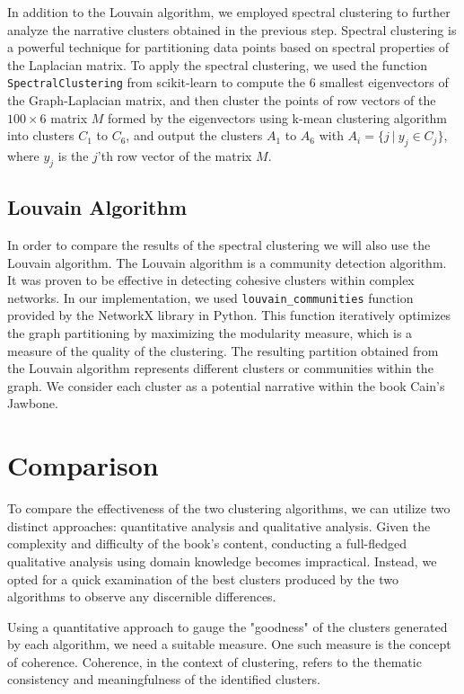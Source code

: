 \documentclass[a4paper]{article}
\begin{document}
In addition to the Louvain algorithm, we employed spectral clustering to further analyze the narrative clusters obtained in the previous step. Spectral clustering is a powerful technique for partitioning data points based on spectral properties of the Laplacian matrix. To apply the spectral clustering, we used the function \verb|SpectralClustering| from scikit-learn \cite{sklearn} to compute the 6 smallest eigenvectors of the Graph-Laplacian matrix, and then cluster the points of row vectors of the $100 \times 6$ matrix $M$ formed by the eigenvectors using k-mean clustering algorithm into clusters $C_1$ to $C_6$, and output the clusters $A_1$ to $A_6$ with $A_{i} = \{j \ | \ y_{j} \in C_{j}\}$, where $y_{j}$ is the $j$'th row vector of the matrix $M$.

\subsection{Louvain Algorithm}

In order to compare the results of the spectral clustering we will also use the Louvain algorithm. The Louvain algorithm is a community detection algorithm. It was proven to be effective in detecting cohesive clusters within complex networks. In our implementation, we used \verb|louvain_communities| function provided by the NetworkX \cite{networkx} library in Python. This function iteratively optimizes the graph partitioning by maximizing the modularity measure, which is a measure of the quality of the clustering. The resulting partition obtained from the Louvain algorithm represents different clusters or communities within the graph. We consider each cluster as a potential narrative within the book Cain's Jawbone.


\section{Comparison}

To compare the effectiveness of the two clustering algorithms, we can utilize two distinct approaches: quantitative analysis and qualitative analysis. Given the complexity and difficulty of the book's content, conducting a full-fledged qualitative analysis using domain knowledge becomes impractical. Instead, we opted for a quick examination of the best clusters produced by the two algorithms to observe any discernible differences.

Using a quantitative approach to gauge the "goodness" of the clusters generated by each algorithm, we need a suitable measure. One such measure is the concept of coherence. Coherence, in the context of clustering, refers to the thematic consistency and meaningfulness of the identified clusters.
\end{document}

